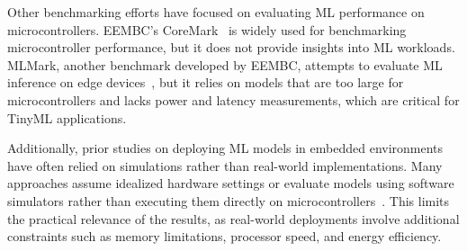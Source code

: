 \documentclass[conference]{IEEEtran}
\begin{document}
Other benchmarking efforts have focused on evaluating ML performance on microcontrollers. {EEMBC's CoreMark}~\cite{coremark2009} is widely used for benchmarking microcontroller performance, but it does not provide insights into ML workloads. {MLMark}, another benchmark developed by EEMBC, attempts to evaluate ML inference on edge devices~\cite{mlmark2020}, but it relies on models that are too large for microcontrollers and lacks power and latency measurements, which are critical for TinyML applications.

Additionally, prior studies on deploying ML models in embedded environments have often relied on {simulations} rather than real-world implementations. Many approaches assume idealized hardware settings or evaluate models using software simulators rather than executing them directly on microcontrollers~\cite{fedorov2019sparse}. This limits the practical relevance of the results, as real-world deployments involve additional constraints such as memory limitations, processor speed, and energy efficiency.


\begin{table}[!htbp]
    \centering
    \vspace{0.6em}
    \caption{Overall results for each scenrio.}
    \label{tab:img}
\end{table}
\end{document}
